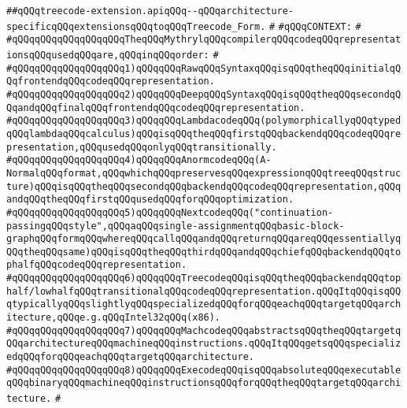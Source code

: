\label{src/lib/compiler/back/low/treecode/treecode-extension.api}
\verb|##qQQqtreecode-extension.apiqQQq--qQQqarchitecture-specificqQQqextensionsqQQqtoqQQqTreecode_Form.|\newline
\verb|#|\newline
\verb|#qQQqCONTEXT:|\newline
\verb|#|\newline
\verb|#qQQqqQQqqQQqqQQqqQQqTheqQQqMythrylqQQqcompilerqQQqcodeqQQqrepresentationsqQQqusedqQQqare,qQQqinqQQqorder:|\newline
\verb|#|\newline
\verb|#qQQqqQQqqQQqqQQqqQQq1)qQQqqQQqRawqQQqSyntaxqQQqisqQQqtheqQQqinitialqQQqfrontendqQQqcodeqQQqrepresentation.|\newline
\verb|#qQQqqQQqqQQqqQQqqQQq2)qQQqqQQqDeepqQQqSyntaxqQQqisqQQqtheqQQqsecondqQQqandqQQqfinalqQQqfrontendqQQqcodeqQQqrepresentation.|\newline
\verb|#qQQqqQQqqQQqqQQqqQQq3)qQQqqQQqLambdacodeqQQq(polymorphicallyqQQqtypedqQQqlambdaqQQqcalculus)qQQqisqQQqtheqQQqfirstqQQqbackendqQQqcodeqQQqrepresentation,qQQqusedqQQqonlyqQQqtransitionally.|\newline
\verb|#qQQqqQQqqQQqqQQqqQQq4)qQQqqQQqAnormcodeqQQq(A-NormalqQQqformat,qQQqwhichqQQqpreservesqQQqexpressionqQQqtreeqQQqstructure)qQQqisqQQqtheqQQqsecondqQQqbackendqQQqcodeqQQqrepresentation,qQQqandqQQqtheqQQqfirstqQQqusedqQQqforqQQqoptimization.|\newline
\verb|#qQQqqQQqqQQqqQQqqQQq5)qQQqqQQqNextcodeqQQq("continuation-passingqQQqstyle",qQQqaqQQqsingle-assignmentqQQqbasic-block-graphqQQqformqQQqwhereqQQqcallqQQqandqQQqreturnqQQqareqQQqessentiallyqQQqtheqQQqsame)qQQqisqQQqtheqQQqthirdqQQqandqQQqchiefqQQqbackendqQQqtophalfqQQqcodeqQQqrepresentation.|\newline
\verb|#qQQqqQQqqQQqqQQqqQQq6)qQQqqQQqTreecodeqQQqisqQQqtheqQQqbackendqQQqtophalf/lowhalfqQQqtransitionalqQQqcodeqQQqrepresentation.qQQqItqQQqisqQQqtypicallyqQQqslightlyqQQqspecializedqQQqforqQQqeachqQQqtargetqQQqarchitecture,qQQqe.g.qQQqIntel32qQQq(x86).|\newline
\verb|#qQQqqQQqqQQqqQQqqQQq7)qQQqqQQqMachcodeqQQqabstractsqQQqtheqQQqtargetqQQqarchitectureqQQqmachineqQQqinstructions.qQQqItqQQqgetsqQQqspecializedqQQqforqQQqeachqQQqtargetqQQqarchitecture.|\newline
\verb|#qQQqqQQqqQQqqQQqqQQq8)qQQqqQQqExecodeqQQqisqQQqabsoluteqQQqexecutableqQQqbinaryqQQqmachineqQQqinstructionsqQQqforqQQqtheqQQqtargetqQQqarchitecture.|\newline
\verb|#|\newline
